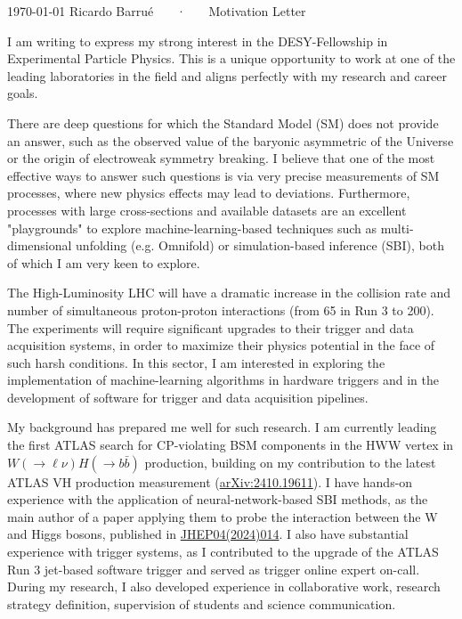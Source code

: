 \documentclass[11pt, a4paper]{awesome-cv}
\begin{document}
\makecvheader[R]

\makecvfooter
  {\today}
  {Ricardo Barrué ~~~·~~~ Motivation Letter}
  {}

\makelettertitle

\begin{cvletter}

I am writing to express my strong interest in the DESY-Fellowship in Experimental Particle Physics. This is a unique opportunity to work at one of the leading laboratories in the field and aligns perfectly with my research and career goals.

There are deep questions for which the Standard Model (SM) does not provide an answer, such as the observed value of the baryonic asymmetric of the Universe or the origin of electroweak symmetry breaking. I believe that one of the most effective ways to answer such questions is via very precise measurements of SM processes, where new physics effects may lead to deviations. Furthermore, processes with large cross-sections and available datasets are an excellent "playgrounds" to explore machine-learning-based techniques such as multi-dimensional unfolding (e.g. Omnifold) or simulation-based inference (SBI), both of which I am very keen to explore.

The High-Luminosity LHC will have a dramatic increase in the collision rate and number of simultaneous proton-proton interactions (from 65 in Run 3 to 200). The experiments will require significant upgrades to their trigger and data acquisition systems, in order to maximize their physics potential in the face of such harsh conditions. In this sector, I am interested in exploring the implementation of machine-learning algorithms in hardware triggers and in the development of software for trigger and data acquisition pipelines.

My background has prepared me well for such research. I am currently leading the first ATLAS search for CP-violating BSM components in the HWW vertex in $W(\to \ell \nu)H(\to b\bar{b})$ production, building on my contribution to the latest ATLAS VH production measurement (\href{https://arxiv.org/abs/2410.19611}{arXiv:2410.19611}). I have hands-on experience with the application of neural-network-based SBI methods, as the main author of a paper applying them to probe the interaction between the W and Higgs bosons, published in \href{http://dx.doi.org/10.1007/JHEP04(2024)014}{JHEP04(2024)014}. I also have substantial experience with trigger systems, as I contributed to the upgrade of the ATLAS Run 3 jet-based software trigger and served as trigger online expert on-call. During my research, I also developed experience in collaborative work, research strategy definition, supervision of students and science communication.


\end{cvletter}
\end{document}
